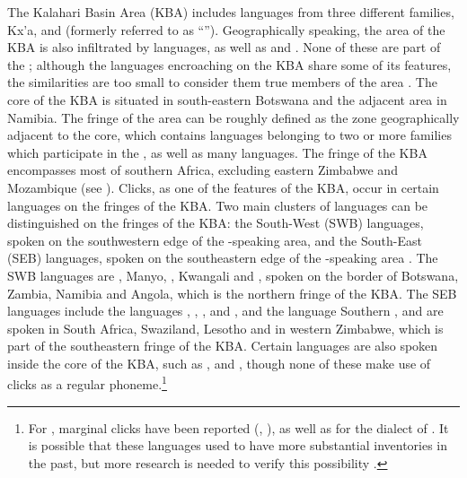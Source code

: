 \documentclass[output=paper,newtxmath,modfonts,nonflat,draftmode]{langsci/langscibook}
\begin{document}
The Kalahari Basin Area (KBA) includes languages from three different families, Kx’a,  and  (formerly referred to as “”). Geographically speaking, the area of the KBA is also infiltrated by  languages, as well as  and . None of these are part of the ; although the  languages encroaching on the KBA share some of its features, the similarities are too small to consider them true members of the area \citep[18]{güldemanntoappear}. The core of the KBA is situated in south-eastern Botswana and the adjacent area in Namibia. The fringe of the area can be roughly defined as the zone geographically adjacent to the core, which contains languages belonging to two or more families which participate in the , as well as many  languages. The fringe of the KBA encompasses most of southern Africa, excluding eastern Zimbabwe and Mozambique (see ). Clicks, as one of the features of the KBA, occur in certain  languages on the fringes of the KBA. Two main clusters of   languages can be distinguished on the fringes of the KBA: the South-West  (SWB)  languages, spoken on the southwestern edge of the -speaking area, and the South-East  (SEB)  languages, spoken on the southeastern edge of the -speaking area \citep{Pakendorf2017}. The SWB languages are , Manyo, , Kwangali and , spoken on the border of Botswana, Zambia, Namibia and Angola, which is the northern fringe of the KBA. The SEB languages include the  languages , , ,  and , and the  language Southern , and are spoken in South Africa, Swaziland, Lesotho and in western Zimbabwe, which is part of the southeastern fringe of the KBA. Certain  languages are also spoken inside the core of the KBA, such as ,  and , though none of these make use of clicks as a regular phoneme.\footnote{For , marginal clicks have been reported (\citealt[298]{Dickens1987}, \citealt[10]{Lukusa2008}), as well as for the  dialect of  \citep[209-210]{Tlale2005}. It is possible that these languages used to have more substantial  inventories in the past, but more research is needed to verify this possibility \citep{Pakendorf2017}.} 
\end{document}
